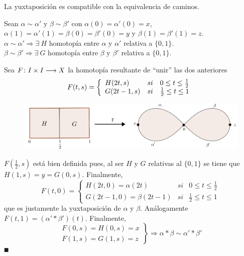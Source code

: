 \documentclass[GTS.tex]{subfiles}
\begin{document}
\begin{lemma} La yuxtaposición es compatible con la equivalencia de caminos.
\end{lemma}
\begin{dem}
Sean $\alpha\sim\alpha'$ y $\beta\sim\beta'$ con $\alpha(0)=\alpha'(0)=x$, $\alpha(1)=\alpha'(1)=\beta(0)=\beta'(0)=y$ y $\beta(1)=\beta'(1)=z$.\\
$\alpha\sim\alpha'\Rightarrow\exists\ H$ homotopía entre $\alpha$ y $\alpha'$ relativa a $\{0,1\}$.\\
$\beta\sim\beta'\Rightarrow\exists\ G$ homotopía entre $\beta$ y $\beta'$ relativa a $\{0,1\}$.

Sea $F\colon{I\times I}\longrightarrow{X}$ la homotopía resultante de ``unir'' las dos anteriores
\[
F(t,s)=\left\{\begin{array}{l c c}
H(2t,s) & si & 0\leq t\leq\frac{1}{2}\\
G(2t-1,s) & si &\frac{1}{2}\leq t\leq 1

\end{array}\right.
\]
\begin{figure}[h!]
	\centering
	\includegraphics[scale=0.28]{yuxta}
\end{figure}

$F(\frac{1}{2},s)$ está bien definida pues, al ser $H$ y $G$ relativas al $\{0,1\}$ se tiene que $H(1,s)=y=G(0,s)$. Finalmente,
\[
F(t,0)=\left\{\begin{array}{lcc}
H(2t,0)=\alpha(2t) & si & 0\leq t\leq\frac{1}{2}\\
G(2t-1,0)=\beta(2t-1) & si & \frac{1}{2}\leq t\leq 1
\end{array}\right.
\]
que es justamente la yuxtaposición de $\alpha$ y $\beta$. Análogamente $F(t,1)=(\alpha'*\beta')(t)$. Finalmente,
\[
\left.\begin{array}{c}
F(0,s)=H(0,s)=x\\
F(1,s)=G(1,s)=z
\end{array}\right\}\Rightarrow \alpha*\beta\sim\alpha'*\beta'
\]
$\QED$
\end{dem}
\end{document}
